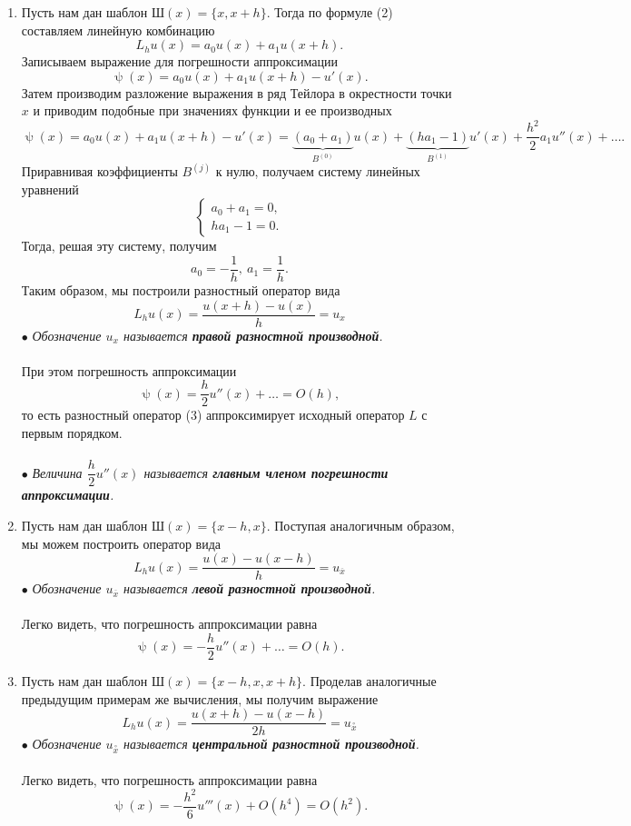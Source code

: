 \documentclass[a4paper, 12pt]{report}
\numberwithin{equation}{section}
\newcommand{\ol}{\overline}
\renewcommand{\psi}{\uppsi}
\begin{document}
\begin{enumerate}
\item Пусть нам дан шаблон $\text{Ш}(x) = \{x, x+h\}$. Тогда по формуле (2) составляем линейную комбинацию
$$L_hu(x) = a_0 u(x) + a_1u(x+h).$$
Записываем выражение для погрешности аппроксимации
$$\psi(x)= a_0u(x) + a_1u(x+h) - u'(x).$$
Затем производим разложение выражения в ряд Тейлора в окрестности точки $x$ и приводим подобные при значениях функции и ее производных
$$\psi(x)= a_0u(x) + a_1u(x+h) - u'(x) = \underbrace{(a_0+a_1)}_{B ^{(0)}}u(x) + \underbrace{(ha_1 - 1)}_{B^{(1)}} u'(x) + \dfrac{h^2}{2} a_1 u''(x) + \ldots.$$
Приравнивая коэффициенты $B^{(j)}$ к нулю, получаем систему линейных уравнений 
$$\begin{cases}
a_0+a_1 = 0,\\
ha_1 - 1= 0.
\end{cases}$$
Тогда, решая эту систему, получим $$a_0 = -\dfrac 1h,\ a_1 = \dfrac 1h.$$
Таким образом, мы построили разностный оператор вида 
\begin{equation}
L_hu(x) = \dfrac{u(x+h) - u(x)}{h} = u_x
\end{equation}
$\bullet$ \textit{Обозначение $u_x$ называется \textbf{правой разностной производной}.}\\\\
При этом погрешность аппроксимации $$\psi(x) = \dfrac h2 u''(x) + \ldots = O(h),$$ то есть разностный оператор (3) аппроксимирует исходный оператор $L$ с первым порядком.\\\\
$\bullet$ \textit{Величина $\dfrac h 2 u''(x)$ называется \textbf{главным членом погрешности аппроксимации}.}
\item Пусть нам дан шаблон $\text{Ш}(x) = \{x-h, x\}$. Поступая аналогичным образом, мы можем построить оператор вида 
\begin{equation}
L_hu(x) = \dfrac{u(x) - u(x-h)}{h} = u_{\ol x}
\end{equation}
$\bullet$ \textit{Обозначение $u_{\ol x}$ называется \textbf{левой разностной производной}. }
\\\\
Легко видеть, что погрешность аппроксимации равна $$\psi(x) = -\dfrac h2 u''(x) + \ldots = O(h).$$ 
\item Пусть нам дан шаблон $\text{Ш}(x) = \{x-h, x, x+h\}$. Проделав аналогичные предыдущим примерам же вычисления, мы получим выражение 
\begin{equation}
L_hu(x) = \dfrac{u(x+h) - u(x-h)}{2h} = u_{\overset\circ x}
\end{equation}
$\bullet$ \textit{Обозначение $u_{\overset\circ x}$ называется \textbf{центральной разностной производной}.}
\\\\
Легко видеть, что погрешность аппроксимации равна $$\psi(x) = -\dfrac {h^2}{6} u'''(x) + O(h^4) = O(h^2).$$ 
\end{enumerate}
\end{document}
